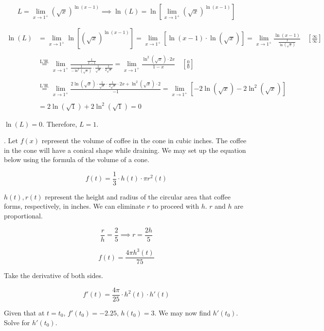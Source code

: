 \documentclass{article}
\begin{document}
\[L=\lim_{x\to1^+}\left(\sqrt x\right)^{\ln(x-1)}\implies
\ln(L) = \ln\left[\lim_{x\to1^+}\left(\sqrt x\right)^{\ln(x-1)}\right]\]

\begin{align*}
\ln(L)&=\lim_{x\to1^+}\ln\left[(\sqrt x)^{\ln(x-1)}\right]=\lim_{x\to1^+}\left[\ln(x-1)\cdot\ln(\sqrt x)\right]=\lim_{x\to1^+}\frac{\ln(x-1)}{\frac1{\ln\left(\sqrt x\right)}}\quad\left[\frac\infty\infty\right]\\\\&\overset{\text{L'H.}}{=}\lim_{x\to1^+}\frac{\frac1{{x-1}}}{\frac1{-\ln^2\left(\sqrt x\right)}\cdot\frac1{\sqrt x}\cdot\frac1{2\sqrt x}}=\lim_{x\to1^+}\frac{\ln^2(\sqrt x)\cdot 2x}{1-x}\quad\left[\frac00\right]\\\\&\overset{\text{L'H.}}{=}\lim_{x\to1^+}\frac{2\ln\left(\sqrt x\right)\cdot \frac1{\sqrt x}\cdot\frac1{2\sqrt x}\cdot2x+\ln^2 (\sqrt x)\cdot 2 }{-1}=\lim_{x\to1^+} \left[-2\ln\left(\sqrt x\right)-2\ln^2\left(\sqrt x\right) \right]\\\\&=2\ln\left(\sqrt 1\right) + 2\ln^2\left(\sqrt 1\right)=0
\end{align*}

\hfill

\noindent $\ln(L)=0$. Therefore, $\boxed{L=1}$.

\hfill

. Let $f(x)$ represent the volume of coffee in the cone in cubic inches. The coffee in the cone will have a conical shape while draining. We may set up the equation below using the formula of the volume of a cone.

\[f(t) = \frac13\cdot h(t)\cdot \pi r^2(t)\]

\hfill

\noindent $h(t), r(t)$ represent the height and radius of the circular area that coffee forms, respectively, in inches. We can eliminate $r$ to proceed with $h$. $r$ and $h$ are proportional.

\[\frac rh=\frac25\implies r=\frac{2h}5\]

\[f(t)=\frac{4\pi h^3(t)}{75}\]

\hfill

\noindent Take the derivative of both sides.

\[f'(t)=\frac{4\pi}{25}\cdot h^2(t)\cdot h'(t)\]

\hfill

\noindent Given that at $t=t_0$, $f'(t_0) = -2.25,\,h(t_0) =3$. We may now find $h'(t_0)$. Solve for $h'(t_0)$.
\end{document}
